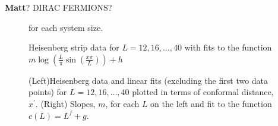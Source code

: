 \documentclass[prl,aps,twocolumn,floatfix,amsmath,amssymb,superscriptaddress,tightenlines]{revtex4}
\begin{document}
{\bf Matt}? DIRAC FERMIONS?


 \begin{figure}[ht]
   \begin{center}
   \end{center}
   \caption{Heisenberg strip data for $L=12,16,\dots,40$ with fits to the function $m\log(\tfrac{L}{\pi}\sin(\tfrac{x\pi}{L}))+h$} for each system size.
   \label{fig:heis_bow}
 \end{figure}

 \begin{figure}[ht]
   \begin{center}
   \end{center}
   \caption{(Left)Heisenberg data and linear fits (excluding the first two data points) for $L=12,16,\dots,40$ plotted in terms of conformal distance, $x^\prime$.
   (Right) Slopes, $m$, for each $L$ on the left {\color{red} and fit to the function $c(L)=L^f+g$}. 
   }
   \label{fig:heis_lines}
 \end{figure}
\end{document}

